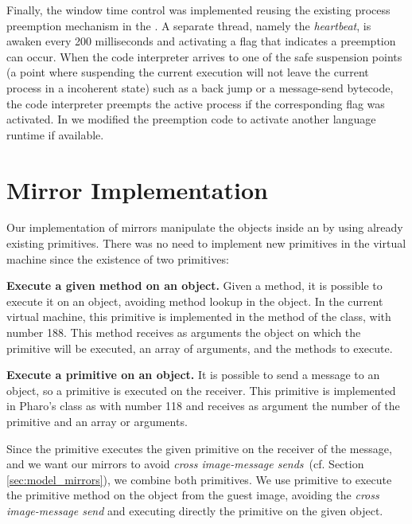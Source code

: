 Finally, the window time control was implemented reusing the existing process preemption mechanism in the \VM. A separate thread, namely the \emph{heartbeat}, is awaken every 200 milliseconds and activating a flag that indicates a preemption can occur. When the \VM code interpreter arrives to one of the safe suspension points (\ie a point where suspending the current execution will not leave the current process in a incoherent state) such as a back jump or a message-send bytecode, the code interpreter preempts the active process if the corresponding flag was activated. In \Vtt we modified the preemption code to activate another language runtime if available.

\section{Mirror Implementation}\label{sec:implementation_mirrors}

Our implementation of mirrors manipulate the objects inside an \objectspace by using already existing primitives. There was no need to implement new primitives in the virtual machine since the existence of two primitives:
\begin{description}
	\item \textbf{Execute a given method on an object.} Given a method, it is possible to execute it on an object, avoiding method lookup in the object. In the current virtual machine, this primitive is implemented in the method \textbf{} of the  class, with number 188. This method receives as arguments the object on which the primitive will be executed, an array of arguments, and the methods to execute.
	\item \textbf{Execute a primitive on an object.} It is possible to send a message to an object, so a primitive is executed on the receiver. This primitive is implemented in Pharo's  class as \textbf{} with number 118 and receives as argument the number of the primitive and an array or arguments.
\end{description}

Since the primitive  executes the given primitive on the receiver of the message, and we want our mirrors to avoid \emph{cross image-message sends}~(cf. Section \ref{sec:model_mirrors}), we combine both primitives. We use primitive  to execute the primitive method  on the object from the guest image, avoiding the \emph{cross image-message send} and executing directly the primitive on the given object.

